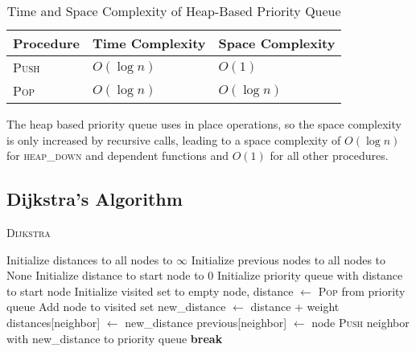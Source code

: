 \documentclass[12pt]{article}
\begin{document}
\begin{table}[h!]
    \centering
    \begin{threeparttable}
        \caption{Time and Space Complexity of Heap-Based Priority Queue}
        \begin{tabular}{@{}lll@{}}
            \toprule
            \textbf{Procedure} & \textbf{Time Complexity} & \textbf{Space Complexity} \\ \midrule
            \textsc{Push}      & $O(\log n)$             & $O(1)$                    \\
            \textsc{Pop}       & $O(\log n)$             & $O(\log n)$                    \\
            \bottomrule
        \end{tabular}
    \end{threeparttable}
\end{table}

The heap based priority queue uses in place operations, so the space complexity is only
increased by recursive calls, leading to a space complexity of $O(\log{n})$ for
\textsc{heap\_down} and dependent functions and $O(1)$ for all other procedures.

\subsection{Dijkstra's Algorithm}

\begin{algorithm}[H]
    \caption{\textsc{Dijkstra}}
    \begin{algorithmic}[1]
        \State Initialize distances to all nodes to $\infty$ 
        \State Initialize previous nodes to all nodes to None 
        \State Initialize distance to start node to 0
        \State Initialize priority queue with distance to start node 
        \State Initialize visited set to empty
         
            \State node, distance $\gets$ \textsc{Pop} from priority queue 
            \State Add node to visited set
             
                    \State new\_distance $\gets$ distance + weight
                        \State distances[neighbor] $\gets$ new\_distance
                        \State previous[neighbor] $\gets$ node
                        \State \textsc{Push} neighbor with new\_distance to priority queue 
                    \EndIf
                \EndIf
            \EndFor
                \State \textbf{break}
            \EndIf
        \EndWhile

    \end{algorithmic}
\end{algorithm}
\end{document}
